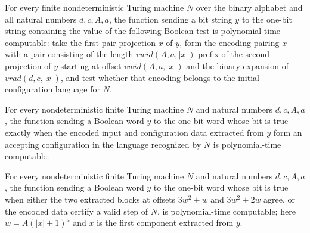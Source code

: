 \begin{theorem}
\label{Complexity.TQBFHard.pt_initB}
\leanok
{}
For every finite nondeterministic Turing machine $N$ over the binary alphabet and all
natural numbers $d,c,A,a$, the function sending a bit string $y$ to the one-bit string
containing the value of the following Boolean test is polynomial-time computable: take
the first pair projection $x$ of $y$, form the encoding pairing $x$ with a pair
consisting of the length-$vwid(A,a,|x|)$ prefix of the second projection of $y$ starting
at offset $vwid(A,a,|x|)$ and the binary expansion of $vrad(d,c,|x|)$, and test whether
that encoding belongs to the initial-configuration language for $N$.
\end{theorem}

\begin{theorem}
\label{Complexity.TQBFHard.pt_accB}
\leanok
{}
For every nondeterministic finite Turing machine $N$ and natural numbers $d,c,A,a$, the
function sending a Boolean word $y$ to the one-bit word whose bit is true exactly when
the encoded input and configuration data extracted from $y$ form an accepting
configuration in the language recognized by $N$ is polynomial-time computable.
\end{theorem}

\begin{theorem}
\label{Complexity.TQBFHard.pt_baseB}
\leanok
{}
For every nondeterministic finite Turing machine $N$ and natural numbers $d,c,A,a$, the
function sending a Boolean word $y$ to the one-bit word whose bit is true when either
the two extracted blocks at offsets $3w^2+w$ and $3w^2+2w$ agree, or the encoded data
certify a valid step of $N$, is polynomial-time computable; here $w=A(|x|+1)^a$ and $x$
is the first component extracted from $y$.
\end{theorem}


